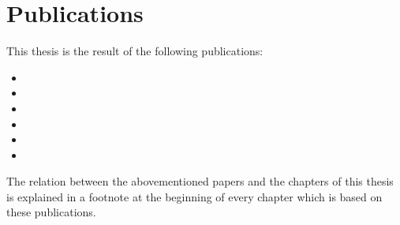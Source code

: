 \begingroup
\let\clearpage\relax
\let\cleardoublepage\relax
\let\cleardoublepage\relax

\manualmark
{} 

\chapter*{Publications}
This thesis is the result of the following publications:
\begin{itemize}

\item  %
\item  %
\item  %
\item  %
\item  %
\item  %


\end{itemize}

The relation between the abovementioned papers and the chapters of this thesis is explained in a footnote at the beginning of every chapter which is based on these publications.



\endgroup
